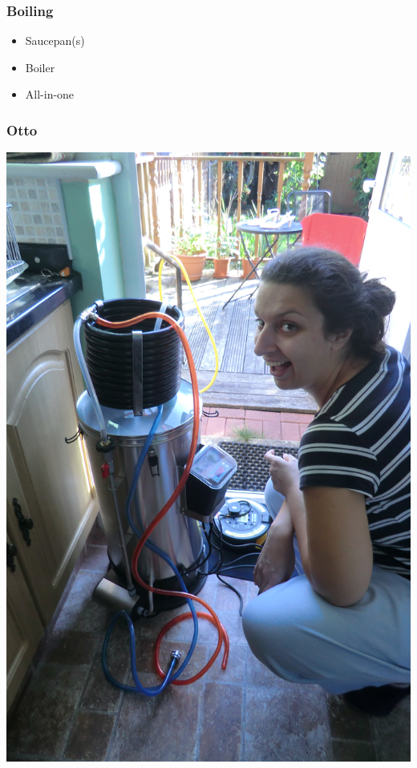 \documentclass{beamer}
\begin{document}
\begin{frame}
  \frametitle{Boiling}
  \begin{itemize}
  \item Saucepan(s)
  \item Boiler
  \item All-in-one
  \end{itemize}
  
\end{frame}
\begin{frame}
  \frametitle{Otto}
  \begin{center}
    \includegraphics[height=0.9\textheight]{CIMG2985.JPG}
  \end{center}
\end{frame}
\end{document}
